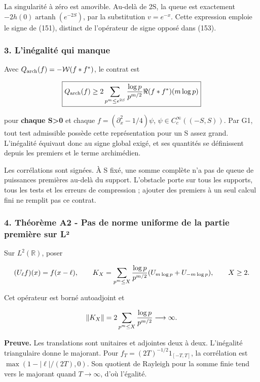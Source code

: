 \documentclass[
  10pt,
  a4paper,
]{article}
\begin{document}
La singularité à zéro est amovible. Au-delà de 2S, la queue est
exactement \(-2h(0)\operatorname{artanh}(e^{-2S})\), par la substitution
\(v=e^{-x}\). Cette expression emploie le signe de (151), distinct de
l'opérateur de signe opposé dans (153).

\hypertarget{linuxe9galituxe9-qui-manque}{%
\subsubsection{3. L'inégalité qui
manque}\label{linuxe9galituxe9-qui-manque}}

Avec \(Q_{\rm arch}(f)=-\mathcal W(f*f^*)\), le contrat est

\[
\boxed{
Q_{\rm arch}(f)\ge
2\sum_{p^m\le e^{2S}}{\log p\over p^{m/2}}\Re(f*f^*)(m\log p)}
\]

pour \textbf{chaque S\textgreater0} et chaque
\(f=(\partial_x^2-1/4)\psi\), \(\psi\in C_c^\infty((-S,S))\). Par G1,
tout test admissible possède cette représentation pour un S assez grand.
L'inégalité équivaut donc au signe global exigé, et ses quantités se
définissent depuis les premiers et le terme archimédien.

Les corrélations sont signées. À S fixé, une somme complète n'a pas de
queue de puissances premières au-delà du support. L'obstacle porte sur
tous les supports, tous les tests et les erreurs de compression ;
ajouter des premiers à un seul calcul fini ne remplit pas ce contrat.

\hypertarget{thuxe9oruxe8me-a2---pas-de-norme-uniforme-de-la-partie-premiuxe8re-sur-luxb2}{%
\subsubsection{4. Théorème A2 - Pas de norme uniforme de la partie
première sur
L²}\label{thuxe9oruxe8me-a2---pas-de-norme-uniforme-de-la-partie-premiuxe8re-sur-luxb2}}

Sur \(L^2(\mathbb R)\), poser

\[
(U_\ell f)(x)=f(x-\ell),\qquad
K_X=\sum_{p^m\le X}{\log p\over p^{m/2}}
(U_{m\log p}+U_{-m\log p}),\qquad X\ge2.
\]

Cet opérateur est borné autoadjoint et

\[
\|K_X\|=2\sum_{p^m\le X}{\log p\over p^{m/2}}
\longrightarrow\infty.
\]

\textbf{Preuve.} Les translations sont unitaires et adjointes deux à
deux. L'inégalité triangulaire donne le majorant. Pour
\(f_T=(2T)^{-1/2}1_{[-T,T]}\), la corrélation est
\(\max(1-|\ell|/(2T),0)\). Son quotient de Rayleigh pour la somme finie
tend vers le majorant quand \(T\to\infty\), d'où l'égalité.
\end{document}
